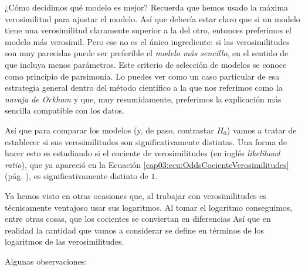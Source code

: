 ¿Cómo decidimos qué modelo es mejor? Recuerda que hemos usado la máxima verosimilitud  para ajustar el modelo. Así que debería estar claro que si un modelo tiene una verosimilitud claramente superior a la del otro, entonces preferimos el modelo más verosímil. Pero ese no es el único ingrediente: si las verosimilitudes son muy parecidas puede ser preferible el {\em modelo más sencillo}, en el sentido de que incluya menos parámetros. Este criterio de selección de modelos se conoce como {\sf principio de parsimonia.} Lo puedes ver como un caso particular de esa estrategia general dentro del método científico a la que nos referimos como la {\em navaja de Ockham} y que, muy resumidamente, preferimos la explicación más sencilla compatible con los datos.

Así que para comparar los modelos (y, de paso, contrastar $H_0$) vamos a tratar de establecer si sus verosimilitudes son significativamente distintas. Una forma de hacer esto es estudiando si el cociente de verosimilitudes  (en inglés {\em likelihood ratio}), que ya apareció en la Ecuación \ref{cap03:ecu:OddsCocienteVerosimilitudes} (pág. \pageref{cap03:ecu:OddsCocienteVerosimilitudes}), es significativamente distinto de $1$.

Ya hemos visto en otras ocasiones que, al trabajar con verosimilitudes es técnicamente ventajoso usar sus logaritmos. Al tomar el logaritmo conseguimos, entre otras cosas, que los cocientes se conviertan en diferencias Así que en realidad la cantidad que vamos a considerar se define en términos de los logaritmos de las verosimilitudes.


\begin{center}
	\end{center}
Algunas observaciones:		

